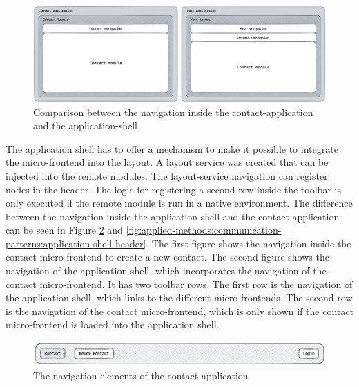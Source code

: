 \ifshowImages
  \begin{figure}[H]
  \centering
  \includegraphics[width=1\linewidth]{images/applied-methods/communication-patterns/layout-comparison.jpg}
  \caption{Comparison between the navigation inside the contact-application and the application-shell.}\label{fig:applied-methods:communication-patterns:comparison-between-host-and-contact-layout}
  \end{figure}
\fi

\noindent The application shell has to offer a mechanism to make it possible to integrate the micro-frontend into the layout. A layout service was created that can be injected into the remote modules. The layout-service navigation can register nodes in the header. The logic for registering a second row inside the toolbar is only executed if the remote module is run in a native environment. The difference between the navigation inside the application shell and the contact application can be seen in Figure \ref{fig:applied-methods:communication-patterns:contact-application-header} and \ref{fig:applied-methods:communication-patterns:application-shell-header}. The first figure shows the navigation inside the contact micro-frontend to create a new contact. The second figure shows the navigation of the application shell, which incorporates the navigation of the contact micro-frontend. It has two toolbar rows. The first row is the navigation of the application shell, which links to the different micro-frontends. The second row is the navigation of the contact micro-frontend, which is only shown if the contact micro-frontend is loaded into the application shell.

\ifshowImages
  \begin{figure}[H]
  \centering
  \includegraphics[width=1\linewidth]{images/applied-methods/communication-patterns/contact-header.png}
  \caption{The navigation elements of the contact-application}\label{fig:applied-methods:communication-patterns:contact-application-header}
  \end{figure}
\fi

